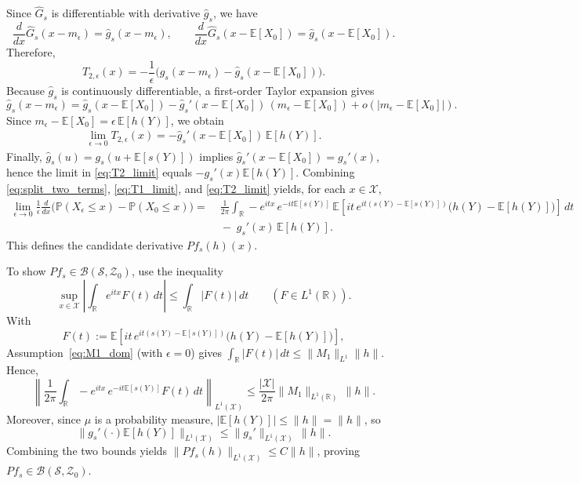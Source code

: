 \documentclass[12pt,leqno]{amsart}
\begin{document}
Since $\hat G_s$ is differentiable with derivative $\hat g_s$, we have
\[
\frac{d}{dx}\hat G_s(x-m_\epsilon)=\hat g_s(x-m_\epsilon),
\qquad
\frac{d}{dx}\hat G_s(x-\mathbb E[X_0])=\hat g_s(x-\mathbb E[X_0]).
\]
Therefore,
\[
T_{2,\epsilon}(x)
=
-\frac{1}{\epsilon}\Big(\hat g_s(x-m_\epsilon)-\hat g_s(x-\mathbb E[X_0])\Big).
\]
Because $\hat g_s$ is continuously differentiable, a first-order Taylor expansion gives
\[
\hat g_s(x-m_\epsilon)
=
\hat g_s(x-\mathbb E[X_0])-\hat g_s'(x-\mathbb E[X_0])\,(m_\epsilon-\mathbb E[X_0])
+o(|m_\epsilon-\mathbb E[X_0]|).
\]
Since $m_\epsilon-\mathbb E[X_0]=\epsilon\,\mathbb E[h(Y)]$, we obtain
\begin{align}\label{eq:T2_limit}
\lim_{\epsilon\to 0}T_{2,\epsilon}(x)
=
-\hat g_s'(x-\mathbb E[X_0])\,\mathbb E[h(Y)].
\end{align}
Finally, $\hat g_s(u)=g_s(u+\mathbb E[s(Y)])$ implies
$\hat g_s'(x-\mathbb E[X_0])=g_s'(x)$, hence the limit in \eqref{eq:T2_limit} equals $-g_s'(x)\mathbb E[h(Y)]$.
Combining \eqref{eq:split_two_terms}, \eqref{eq:T1_limit}, and \eqref{eq:T2_limit} yields, for each $x\in\mathcal{X}$,
\begin{align*}
\lim_{\epsilon\to 0}\frac{1}{\epsilon}\frac{d}{dx}\Big(\mathbb P(X_\epsilon\le x)-\mathbb P(X_0\le x)\Big)
=&\;\frac{1}{2\pi}\int_{\mathbb R}-e^{itx}\,e^{-it\mathbb E[s(Y)]}\,
\mathbb E\!\left[it\,e^{it(s(Y)-\mathbb E[s(Y)])}\big(h(Y)-\mathbb E[h(Y)]\big)\right]\,dt\\
&\;-\;g_s'(x)\,\mathbb E[h(Y)].
\end{align*}
This defines the candidate derivative $Pf_s(h)(x)$.

To show $Pf_s\in\mathcal{B}(\mathcal{S},\mathcal{Z}_0)$, use the inequality
\[
\sup_{x\in\mathcal{X}}\left|\int_{\mathbb R} e^{itx}F(t)\,dt\right|\le \int_{\mathbb R}|F(t)|\,dt
\qquad (F\in L^1(\mathbb R)).
\]
With
\[
F(t):=
\mathbb E\!\left[it\,e^{it(s(Y)-\mathbb E[s(Y)])}\big(h(Y)-\mathbb E[h(Y)]\big)\right],
\]
Assumption~\eqref{eq:M1_dom} (with $\epsilon=0$) gives $\int_{\mathbb R}|F(t)|\,dt\le \|M_1\|_{L^1}\|h\|$.
Hence,
\[
\left\|\frac{1}{2\pi}\int_{\mathbb R}-e^{itx}\,e^{-it\mathbb E[s(Y)]}F(t)\,dt\right\|_{L^1(\mathcal{X})}
\le \frac{|\mathcal{X}|}{2\pi}\|M_1\|_{L^1(\mathbb R)}\,\|h\|.
\]
Moreover, since $\mu$ is a probability measure, $|\mathbb E[h(Y)]|\le \|h\|=\|h\|$, so
\[
\|g_s'(\cdot)\mathbb E[h(Y)]\|_{L^1(\mathcal{X})}\le \|g_s'\|_{L^1(\mathcal{X})}\,\|h\|.
\]
Combining the two bounds yields $\|Pf_s(h)\|_{L^1(\mathcal{X})}\le C\|h\|$, proving $Pf_s\in\mathcal{B}(\mathcal{S},\mathcal{Z}_0)$.
\end{document}
